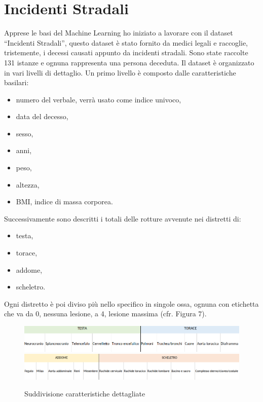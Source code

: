\documentclass[12pt,italian]{report}
\begin{document}
\section{Incidenti Stradali}
\label{incidentiStradali}
Apprese le basi del Machine Learning ho iniziato a lavorare con il dataset ``Incidenti Stradali'', questo dataset è stato fornito da medici legali e raccoglie, tristemente, i decessi causati appunto da incidenti stradali. Sono state raccolte 131 istanze e ognuna rappresenta una persona deceduta. Il dataset è organizzato in vari livelli di dettaglio. Un primo livello è composto dalle  caratteristiche basilari:
\begin{itemize}
	\item numero del verbale, verrà usato come indice univoco,
	\item data del decesso,
	\item sesso,
	\item anni,
	\item peso,
	\item altezza,
	\item BMI, indice di massa corporea.
\end{itemize}
Successivamente sono descritti i totali delle rotture avvenute nei distretti di:
\begin{itemize}
	\item testa,
	\item torace,
	\item addome,
	\item scheletro.
\end{itemize}
Ogni distretto è poi diviso più nello specifico in singole ossa, ognuna con etichetta che va da 0, nessuna lesione, a 4, lesione massima (cfr. Figura 7).
\begin{figure}[h]
	\centering
	\includegraphics[width = \textwidth]{immagini/testa-torace-dataset}
	\includegraphics[width = \textwidth]{immagini/addome-scheletro-dataset}
	\caption{Suddivisione caratteristiche dettagliate}
\end{figure}
\end{document}
